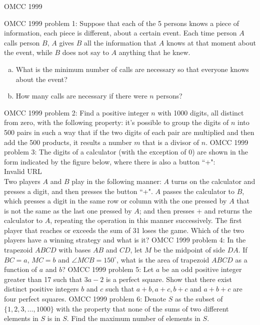 OMCC 1999 

OMCC 1999 problem 1:  Suppose that each of the 5 persons knows a piece of information, each piece is different, about a certain event. Each time person $A$ calls person $B$, $A$ gives $B$ all the information that $A$ knows at that moment about the event, while $B$ does not say to $A$ anything that he knew.
\begin{enumerate}[(a)]
  \item What is the minimum number of calls are necessary so that everyone knows about the event?
  \item How many calls are necessary if there were $n$ persons?
\end{enumerate} 
OMCC 1999 problem 2:  Find a positive integer $n$ with 1000 digits, all distinct from zero, with the following property: it's possible to group the digits of $n$ into 500 pairs in such a way that if the two digits of each pair are multiplied and then add the 500 products, it results a number $m$ that is a divisor of $n$. 
OMCC 1999 problem 3:  The digits of a calculator (with the exception of 0) are shown in the form indicated by the figure below, where there is also a button ``+": \\
Invalid URL \\
Two players $A$ and $B$ play in the following manner: $A$ turns on the calculator and presses a digit, and then presses the button ``+". $A$ passes the calculator to $B$, which presses a digit in the same row or column with the one pressed by $A$ that is not the same as the last one pressed by $A$; and then presses + and returns the calculator to $A$, repeating the operation in this manner successively. The first player that reaches or exceeds the sum of 31 loses the game. Which of the two players have a winning strategy and what is it? 
OMCC 1999 problem 4:  In the trapezoid $ABCD$ with bases $AB$ and $CD$, let $M$ be the midpoint of side $DA$. If $BC=a$, $MC=b$ and $\angle MCB=150^\circ$, what is the area of trapezoid $ABCD$ as a function of $a$ and $b$? 
OMCC 1999 problem 5:  Let $a$ be an odd positive integer greater than 17 such that $3a-2$ is a perfect square. Show that there exist distinct positive integers $b$ and $c$ such that $a+b,a+c,b+c$ and $a+b+c$ are four perfect squares. 
OMCC 1999 problem 6:  Denote $S$ as the subset of $\{1,2,3,\dots,1000\}$ with the property that none of the sums of two different elements in $S$ is in $S$. Find the maximum number of elements in $S$. 
